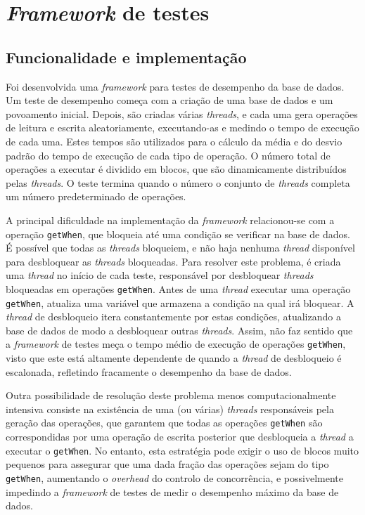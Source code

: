 \documentclass[11pt, a4paper]{article}
\begin{document}
\section{\emph{Framework} de testes}

\subsection{Funcionalidade e implementação}

Foi desenvolvida uma \emph{framework} para testes de desempenho da base de dados. Um teste de
desempenho começa com a criação de uma base de dados e um povoamento inicial. Depois, são criadas
várias \emph{threads}, e cada uma gera operações de leitura e escrita aleatoriamente, executando-as
e medindo o tempo de execução de cada uma. Estes tempos são utilizados para o cálculo da média e do
desvio padrão do tempo de execução de cada tipo de operação. O número total de operações a executar
é dividido em blocos, que são dinamicamente distribuídos pelas \emph{threads}. O teste termina
quando o número o conjunto de \emph{threads} completa um número predeterminado de operações.

A principal dificuldade na implementação da \emph{framework} relacionou-se com a operação
\texttt{getWhen}, que bloqueia até uma condição se verificar na base de dados. É possível que todas
as \emph{threads} bloqueiem, e não haja nenhuma \emph{thread} disponível para desbloquear as
\emph{threads} bloqueadas. Para resolver este problema, é criada uma \emph{thread} no início de cada
teste, responsável por desbloquear \emph{threads} bloqueadas em operações \texttt{getWhen}. Antes de
uma \emph{thread} executar uma operação \texttt{getWhen}, atualiza uma variável que armazena a
condição na qual irá bloquear. A \emph{thread} de desbloqueio itera constantemente por estas
condições, atualizando a base de dados de modo a desbloquear outras \emph{threads}. Assim, não faz
sentido que a \emph{framework} de testes meça o tempo médio de execução de operações
\texttt{getWhen}, visto que este está altamente dependente de quando a \emph{thread} de desbloqueio
é escalonada, refletindo fracamente o desempenho da base de dados.

Outra possibilidade de resolução deste problema menos computacionalmente intensiva consiste na
existência de uma (ou várias) \emph{threads} responsáveis pela geração das operações, que garantem
que todas as operações \texttt{getWhen} são correspondidas por uma operação de escrita posterior que
desbloqueia a \emph{thread} a executar o \texttt{getWhen}. No entanto, esta estratégia pode exigir o
uso de blocos muito pequenos para assegurar que uma dada fração das operações sejam do tipo
\texttt{getWhen}, aumentando o \emph{overhead} do controlo de concorrência, e possivelmente
impedindo a \emph{framework} de testes de medir o desempenho máximo da base de dados.
\end{document}
